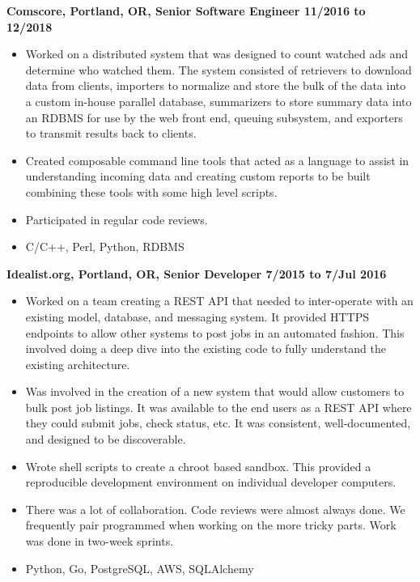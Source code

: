 \documentclass{res}
\begin{document}
\begin{resume}
  {\large \bf Comscore, Portland, OR, Senior Software Engineer \hfill 11/2016 to 12/2018}
  \begin{itemize}

  \item
    Worked on a distributed system that was designed to count watched ads
    and determine who watched them.  The system consisted of retrievers to
    download data from clients, importers to normalize and store the bulk
    of the data into a custom in-house parallel database, summarizers
    to store summary data into an RDBMS for use by the web front end,
    queuing subsystem, and exporters to transmit results back to clients.

  \item
    Created composable command line tools that acted as a language to
    assist in understanding incoming data and creating custom reports to
    be built combining these tools with some high level scripts.

  \item
    Participated in regular code reviews.

  \item
    C/C++, Perl, Python, RDBMS

  \end{itemize}

  {\large \bf Idealist.org, Portland, OR, Senior Developer \hfill 7/2015 to 7/Jul 2016}
  \begin{itemize}
    \item
    Worked on a team creating a REST API that needed
    to inter-operate with an existing model, database, and messaging
    system. It provided HTTPS endpoints to allow other systems to post
    jobs in an automated fashion.  This involved doing
    a deep dive into the existing code to fully understand the existing
    architecture.
    \item
    Was involved in the creation of a new system that would allow
    customers to bulk post job listings.  It was available to the end users
    as a REST API where they could submit jobs, check status, etc.
    It was consistent, well-documented, and designed to be discoverable.
    \item
    Wrote shell scripts to create a chroot based sandbox.  This provided
    a reproducible development environment on individual developer
    computers.
    \item
    There was a lot of collaboration.  Code reviews were almost always
    done.  We frequently pair programmed when working on the
    more tricky parts.  Work was done in two-week sprints.
    \item
    Python, Go, PostgreSQL, AWS, SQLAlchemy
  \end{itemize}


\end{resume}
\end{document}
